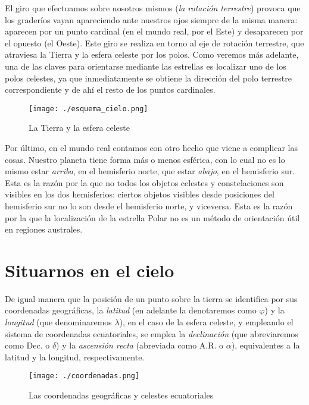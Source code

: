 \documentclass[10pt,a5paper,twoside]{amsbook}
\begin{document}
El giro que efectuamos sobre nosotros mismos (\textit{la rotación terrestre}) provoca que los graderíos vayan apareciendo ante nuestros ojos siempre de la misma manera: aparecen por un punto cardinal (en el mundo real, por el Este) y desaparecen por el opuesto (el Oeste). Este giro se realiza en torno al eje de rotación terrestre, que atraviesa la Tierra y la esfera celeste por los polos. Como veremos más adelante, una de las claves para orientarse mediante las estrellas es localizar uno de los polos celestes, ya que inmediatamente se obtiene la dirección del polo terrestre correspondiente y de ahí el resto de los puntos cardinales.

\vspace*{0.4in}

\begin{figure}[ht]
 \centering
 \texttt{[image: ./esquema\_cielo.png]}
 \caption{La Tierra y la esfera celeste}
 \label{tierra_esfera}
\end{figure}


Por último, en el mundo real contamos con otro hecho que viene a complicar las cosas. Nuestro planeta tiene forma más o menos esférica, con lo cual no es lo mismo estar \textit{arriba}, en el hemisferio norte, que estar \textit{abajo}, en el hemisferio sur. Esta es la razón por la que no todos los objetos celestes y constelaciones son visibles en los dos hemisferios: ciertos objetos visibles desde posiciones del hemisferio sur no lo son desde el hemisferio norte, y viceversa. Esta es la razón por la que la localización de la estrella Polar no es un método de orientación útil en regiones australes.

\section{Situarnos en el cielo}

De igual manera que la posición de un punto sobre la tierra se identifica por sus coordenadas geográficas, la \textit{latitud} (en adelante la denotaremos como $\varphi$) y la \textit{longitud} (que denominaremos $\lambda$), en el caso de la esfera celeste, y empleando el sistema de coordenadas ecuatoriales, se emplea la \textit{declinación} (que abreviaremos como Dec. o $\delta$) y la \textit{ascensión recta} (abreviada como A.R. o $\alpha$), equivalentes a la latitud y la longitud, respectivamente.

\begin{figure}[ht]
 \centering
 \texttt{[image: ./coordenadas.png]}
 \caption{Las coordenadas geográficas y celestes ecuatoriales}
 \label{coordenadas}
\end{figure}
\end{document}

